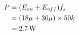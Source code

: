 \subsection{}

\begin{align*}
P & = (E_{on} + E_{off} ) f_s \\
  & = (18\mu + 36\mu ) \times 50k \\
  & = \unit[2.7]{W}
\end{align*}